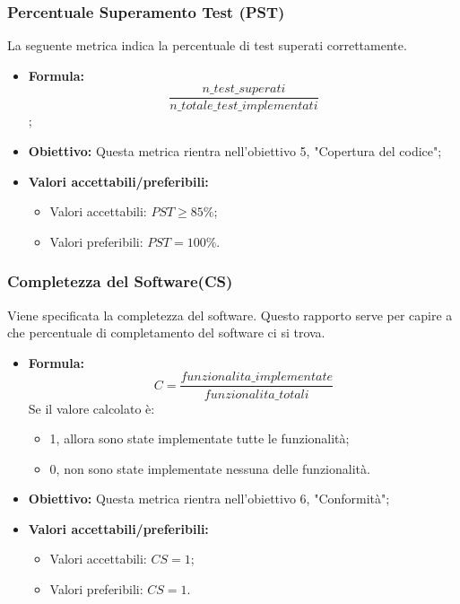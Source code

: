 \subsubsection{Percentuale Superamento Test (PST)}
La seguente metrica indica la percentuale di test superati correttamente.
\begin{itemize}
	\item \textbf{Formula:} \[\frac{n\_test\_superati}{n\_totale\_test\_implementati}\];
	\item \textbf{Obiettivo:} Questa metrica rientra nell'obiettivo 5, "Copertura del codice";
	\item \textbf{Valori accettabili/preferibili: }
	\begin{itemize}
		\item Valori accettabili: $PST \geq 85\%$;
		\item Valori preferibili: $PST = 100\%$.
	\end{itemize}
\end{itemize}


\subsubsection{Completezza del Software(CS)}
Viene specificata la completezza del software. Questo rapporto serve per capire a che percentuale di completamento del software ci si trova.
\begin{itemize}
	\item \textbf{Formula:} \[C = \frac{funzionalita\_implementate }{funzionalita\_totali}\]
	Se il valore calcolato è:
	\begin{itemize}
		\item 1, allora sono state implementate tutte le funzionalità;
		\item 0, non sono state implementate nessuna delle funzionalità.
	\end{itemize}
	\item \textbf{Obiettivo:} Questa metrica rientra nell'obiettivo 6, "Conformità";
	\item \textbf{Valori accettabili/preferibili: }
	\begin{itemize}
		\item Valori accettabili: $CS = 1$;
		\item Valori preferibili: $CS = 1$.
	\end{itemize}
\end{itemize}


